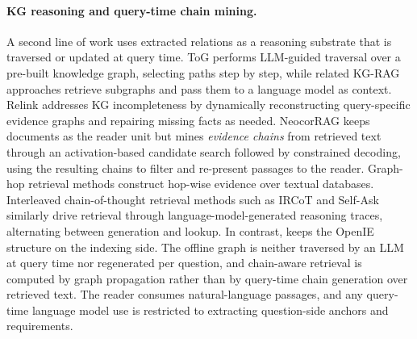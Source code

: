 \paragraph{KG reasoning and query-time chain mining.}
A second line of work uses extracted relations as a reasoning substrate
that is traversed or updated at query time. ToG \citep{sun2024tog}
performs LLM-guided traversal over a pre-built knowledge graph,
selecting paths step by step, while related KG-RAG approaches
\citep{baek2023kaping} retrieve subgraphs and pass them to a language
model as context. Relink \citep{huang2026relink} addresses KG
incompleteness by dynamically reconstructing query-specific evidence
graphs and repairing missing facts as needed. NeocorRAG
\citep{peng2026neocorrag} keeps documents as the reader unit but
mines \emph{evidence chains} from retrieved text through an
activation-based candidate search followed by constrained decoding,
using the resulting chains to filter and re-present passages to the
reader. Graph-hop retrieval methods \citep{zhu2024reasongraphqa}
construct hop-wise evidence over textual databases. Interleaved
chain-of-thought retrieval methods such as IRCoT
\citep{trivedi2023ircot} and Self-Ask
\citep{press2023selfask} similarly drive retrieval through
language-model-generated reasoning traces, alternating between
generation and lookup. In contrast, \methodname{} keeps the OpenIE
structure on the indexing side. The offline graph is neither traversed
by an LLM at query time nor regenerated per question, and chain-aware
retrieval is computed by graph propagation rather than by query-time
chain generation over retrieved text. The reader consumes
natural-language passages, and any query-time language model use is
restricted to extracting question-side anchors and requirements.

